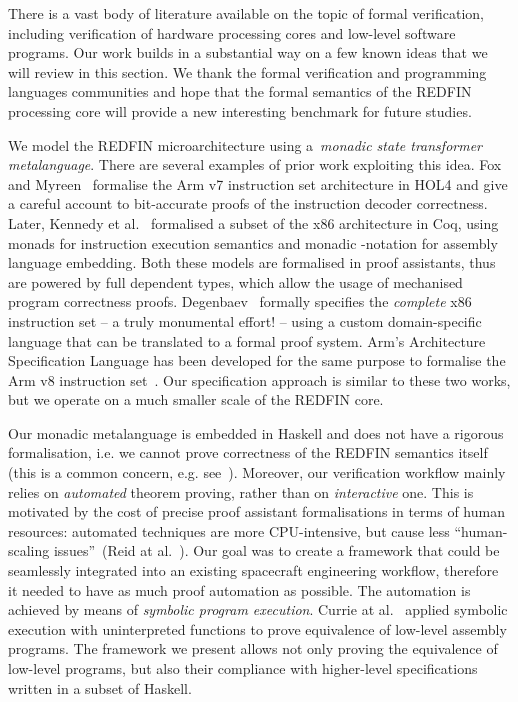 
There is a vast body of literature available on the topic of formal verification,
including verification of hardware processing cores and low-level software programs.
Our work builds in a substantial way on a few known ideas that we will review in
this section. We thank the formal verification and programming languages
communities and hope that the formal semantics of the REDFIN processing core will
provide a new interesting benchmark for future studies.

We model the REDFIN microarchitecture using a~\emph{monadic state transformer
metalanguage}. There are several examples of prior work exploiting this idea.
Fox and Myreen~\cite{fox2010trustworthy} formalise the Arm v7 instruction
set architecture in HOL4 and give a careful account to bit-accurate proofs of
the instruction decoder correctness. Later, Kennedy et al.~\cite{kennedy2013coq}
formalised a subset of the x86 architecture in Coq, using monads for instruction
execution semantics and monadic -notation for assembly language embedding.
Both these models are formalised in proof assistants, thus are powered by full
dependent types, which allow the usage of mechanised program correctness proofs.
Degenbaev~\cite{degenbaev2012formal} formally specifies the \emph{complete} x86
instruction set -- a truly monumental effort! -- using a custom domain-specific
language that can be translated to a formal proof system. Arm's Architecture
Specification Language has been developed for the same purpose to formalise the
Arm v8 instruction set~\cite{reid2016cav}. Our specification approach is similar
to these two works, but we operate on a much smaller scale of the REDFIN core.

Our monadic metalanguage is embedded in Haskell and does not have a rigorous
formalisation, i.e. we cannot prove correctness of the REDFIN semantics
itself (this is a common concern, e.g. see~\cite{reid2017oopsla}). Moreover, our
verification workflow mainly relies on \emph{automated} theorem proving, rather
than on \emph{interactive} one. This is motivated by the cost of precise proof
assistant formalisations in terms of human resources: automated techniques are
more CPU-intensive, but cause less ``human-scaling issues''~(Reid at
al.~\cite{reid2016cav}). Our goal was to create a framework that could be seamlessly
integrated into an existing spacecraft engineering workflow, therefore it needed
to have as much proof automation as possible. The automation is achieved by means
of \emph{symbolic program execution}. Currie at al.~\cite{Currie2006} applied
symbolic execution with uninterpreted functions to prove equivalence of low-level
assembly programs. The framework we present allows not only proving the
equivalence of low-level programs, but also their compliance with higher-level
specifications written in a subset of Haskell.

